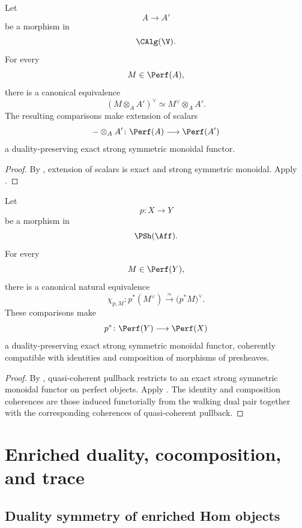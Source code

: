 \begin{corollary}
\label{cor:base-change-perfect-duality}
Let
\[
    A
    \longrightarrow
    A'
\]
be a morphism in
\[
    \CAlg(\V).
\]
For every
\[
    M\in\Perf(A),
\]
there is a canonical equivalence
\[
    (M\otimes_A A')^\vee
    \simeq
    M^\vee\otimes_A A'.
\]
The resulting comparisons make extension of scalars
\[
    -\otimes_A A'
    \colon
    \Perf(A)
    \longrightarrow
    \Perf(A')
\]
a duality-preserving exact strong symmetric monoidal functor.
\end{corollary}

\begin{proof}
By
,
extension of scalars is exact and strong symmetric monoidal. Apply
.
\end{proof}

\begin{corollary}
\label{cor:pullback-perfect-duality}
Let
\[
    p
    \colon
    X
    \longrightarrow
    Y
\]
be a morphism in
\[
    \PSh(\Aff).
\]
For every
\[
    M\in\Perf(Y),
\]
there is a canonical natural equivalence
\[
    \chi_{p,M}
    \colon
    p^*(M^\vee)
    \xrightarrow{\;\simeq\;}
    \bigl(p^*M\bigr)^\vee.
\]
These comparisons make
\[
    p^*
    \colon
    \Perf(Y)
    \longrightarrow
    \Perf(X)
\]
a duality-preserving exact strong symmetric monoidal functor, coherently
compatible with identities and composition of morphisms of presheaves.
\end{corollary}

\begin{proof}
By
,
quasi-coherent pullback restricts to an exact strong symmetric monoidal
functor on perfect objects. Apply
.
The identity and composition coherences are those induced functorially from
the walking dual pair together with the corresponding coherences of
quasi-coherent pullback.
\end{proof}

\section{Enriched duality, cocomposition, and trace}
\label{sec:canonical-perfect-duality-trace}


\subsection{Duality symmetry of enriched Hom objects}

